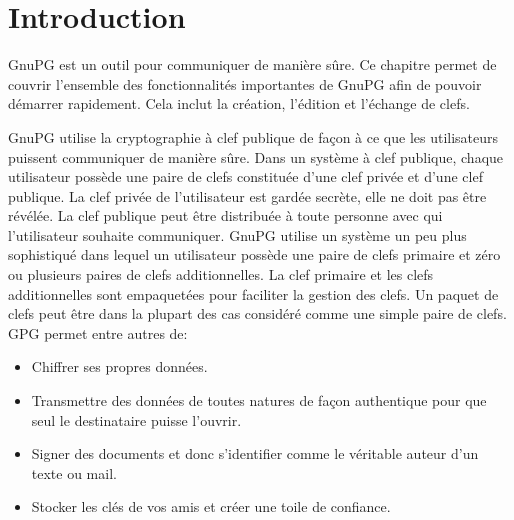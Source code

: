 \section{Introduction}

GnuPG est un outil pour communiquer de manière sûre. Ce chapitre permet de couvrir l'ensemble des fonctionnalités 
importantes de GnuPG afin de pouvoir démarrer rapidement. Cela inclut la création, l'édition et l'échange de clefs.

GnuPG utilise la cryptographie à clef publique de façon à ce que les utilisateurs puissent communiquer de manière sûre. 
Dans un système à clef publique, chaque utilisateur possède une paire de clefs constituée d'une clef privée et d'une clef publique. 
La clef privée de l'utilisateur est gardée secrète, elle ne doit pas être révélée. La clef publique peut être distribuée à toute personne
avec qui l'utilisateur souhaite communiquer. GnuPG utilise un système un peu plus sophistiqué dans lequel un utilisateur possède 
une paire de clefs primaire et zéro ou plusieurs paires de clefs additionnelles. La clef primaire et les clefs additionnelles sont 
empaquetées pour faciliter la gestion des clefs. Un paquet de clefs peut être dans la plupart des cas considéré comme une simple paire 
de clefs.\\

GPG permet entre autres de:
\begin{itemize}
\item Chiffrer ses propres données.
\item Transmettre des données de toutes natures de façon authentique pour que seul le destinataire puisse l'ouvrir.
\item Signer des documents et donc s'identifier comme le véritable auteur d'un texte ou mail.
\item Stocker les clés de vos amis et créer une toile de confiance.
\end{itemize}